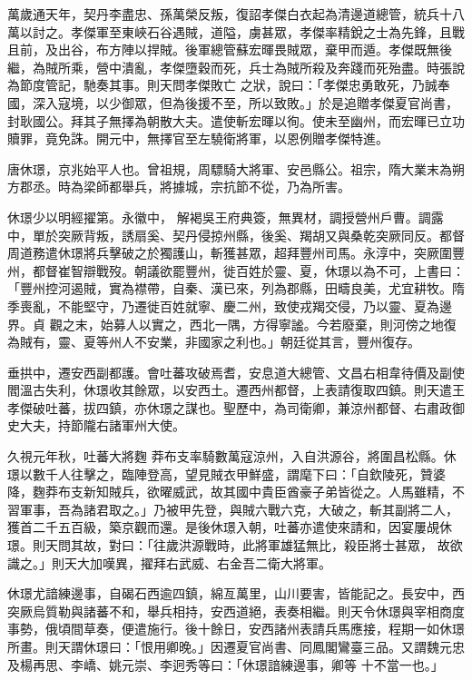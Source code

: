 \begin{pinyinscope}
 萬歲通天年，契丹李盡忠、孫萬榮反叛，復詔孝傑白衣起為清邊道總管，統兵十八萬以討之。孝傑軍至東峽石谷遇賊，道隘，虜甚眾，孝傑率精銳之士為先鋒，且戰且前，及出谷，布方陣以捍賊。後軍總管蘇宏暉畏賊眾，棄甲而遁。孝傑既無後繼，為賊所乘，營中潰亂，孝傑墮穀而死，兵士為賊所殺及奔踐而死殆盡。時張說為節度管記，馳奏其事。則天問孝傑敗亡
 之狀，說曰：「孝傑忠勇敢死，乃誠奉國，深入寇境，以少御眾，但為後援不至，所以致敗。」於是追贈孝傑夏官尚書，封耿國公。拜其子無擇為朝散大夫。遣使斬宏暉以徇。使未至幽州，而宏暉已立功贖罪，竟免誅。開元中，無擇官至左驍衛將軍，以恩例贈孝傑特進。



 唐休璟，京兆始平人也。曾祖規，周驃騎大將軍、安邑縣公。祖宗，隋大業末為朔方郡丞。時為梁師都舉兵，將據城，宗抗節不從，乃為所害。



 休璟少以明經擢第。永徽中，
 解褐吳王府典簽，無異材，調授營州戶曹。調露中，單於突厥背叛，誘扇奚、契丹侵掠州縣，後奚、羯胡又與桑乾突厥同反。都督周道務遣休璟將兵擊破之於獨護山，斬獲甚眾，超拜豐州司馬。永淳中，突厥圍豐州，都督崔智辯戰歿。朝議欲罷豐州，徙百姓於靈、夏，休璟以為不可，上書曰：「豐州控河遏賊，實為襟帶，自秦、漢已來，列為郡縣，田疇良美，尤宜耕牧。隋季喪亂，不能堅守，乃遷徙百姓就寧、慶二州，致使戎羯交侵，乃以靈、夏為邊界。貞
 觀之末，始募人以實之，西北一隅，方得寧謐。今若廢棄，則河傍之地復為賊有，靈、夏等州人不安業，非國家之利也。」朝廷從其言，豐州復存。



 垂拱中，遷安西副都護。會吐蕃攻破焉耆，安息道大總管、文昌右相韋待價及副使閻溫古失利，休璟收其餘眾，以安西土。遷西州都督，上表請復取四鎮。則天遣王孝傑破吐蕃，拔四鎮，亦休璟之謀也。聖歷中，為司衛卿，兼涼州都督、右肅政御史大夫，持節隴右諸軍州大使。



 久視元年秋，吐蕃大將麴
 莽布支率騎數萬寇涼州，入自洪源谷，將圍昌松縣。休璟以數千人往擊之，臨陣登高，望見賊衣甲鮮盛，謂麾下曰：「自欽陵死，贊婆降，麴莽布支新知賊兵，欲曜威武，故其國中貴臣酋豪子弟皆從之。人馬雖精，不習軍事，吾為諸君取之。」乃被甲先登，與賊六戰六克，大破之，斬其副將二人，獲首二千五百級，築京觀而還。是後休璟入朝，吐蕃亦遣使來請和，因宴屢覘休璟。則天問其故，對曰：「往歲洪源戰時，此將軍雄猛無比，殺臣將士甚眾，
 故欲識之。」則天大加嘆異，擢拜右武威、右金吾二衛大將軍。



 休璟尤諳練邊事，自碣石西逾四鎮，綿亙萬里，山川要害，皆能記之。長安中，西突厥烏質勒與諸蕃不和，舉兵相持，安西道絕，表奏相繼。則天令休璟與宰相商度事勢，俄頃間草奏，便遣施行。後十餘日，安西諸州表請兵馬應接，程期一如休璟所畫。則天謂休璟曰：「恨用卿晚。」因遷夏官尚書、同鳳閣鸞臺三品。又謂魏元忠及楊再思、李嶠、姚元崇、李迥秀等曰：「休璟諳練邊事，卿等
 十不當一也。」




\end{pinyinscope}

